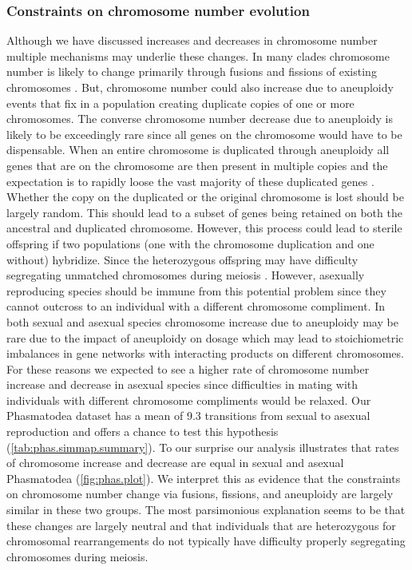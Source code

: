 \subsubsection{Constraints on chromosome number evolution}
Although we have discussed increases and decreases in chromosome number multiple mechanisms may underlie these changes.
In many clades chromosome number is likely to change primarily through fusions and fissions of existing chromosomes \citep{sved2016, blackmon2019meiotic}.
But, chromosome number could also increase due to aneuploidy events that fix in a population creating duplicate copies of one or more chromosomes.
The converse chromosome number decrease due to aneuploidy is likely to be exceedingly rare since all genes on the chromosome would have to be dispensable.
When an entire chromosome is duplicated through aneuploidy all genes that are on the chromosome are then present in multiple copies and the expectation is to rapidly loose the vast majority of these duplicated genes \citep{ohno}.
Whether the copy on the duplicated or the original chromosome is lost should be largely random.
This should lead to a subset of genes being retained on both the ancestral and duplicated chromosome.
However, this process could lead to sterile offspring if two populations (one with the chromosome duplication and one without) hybridize.
Since the heterozygous offspring may have difficulty segregating unmatched chromosomes during meiosis \citep{white1978}.
However, asexually reproducing species should be immune from this potential problem since they cannot outcross to an individual with a different chromosome compliment. 
In both sexual and asexual species chromosome increase due to aneuploidy may be rare due to the impact of aneuploidy on dosage which may lead to stoichiometric imbalances in gene networks with interacting products on different chromosomes.
For these reasons we expected to see a higher rate of chromosome number increase and decrease in asexual species since difficulties in mating with individuals with different chromosome compliments would be relaxed.
Our Phasmatodea dataset has a mean of 9.3 transitions from sexual to asexual reproduction and offers a chance to test this hypothesis (\cref{tab:phas.simmap.summary}).
To our surprise our analysis illustrates that rates of chromosome increase and decrease are equal in sexual and asexual Phasmatodea (\cref{fig:phas.plot}).
We interpret this as evidence that the constraints on chromosome number change via fusions, fissions, and aneuploidy are largely similar in these two groups. 
The most parsimonious explanation seems to be that these changes are largely neutral and that individuals that are heterozygous for chromosomal rearrangements do not typically have difficulty properly segregating chromosomes during meiosis.

